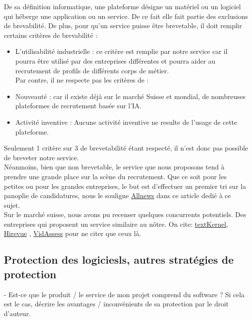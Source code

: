 De sa définition informatique, une plateforme désigne un matériel ou un logiciel qui héberge une application ou un service. De ce fait elle fait partie des exclusions de brevabilité. De plus, pour qu'un service puisse être brevetable, il doit remplir certains critères de brevabilité : 
 \begin{itemize}
     \item L'utilisabilité industrielle : ce critère est remplie par notre service car il pourra être utilisé par des entreprises différentes et pourra aider au recrutement de profils de différents corps de métier. \\
     Par contre, il ne respecte pas les critères de :
     \item Nouveauté : car il existe déjà sur le marché Suisse et mondial, de nombreuses plateformes de recrutement basée sur l'IA.
     \item Activité inventive : Aucune activité inventive ne resulte de l'usage de cette plateforme. 
 \end{itemize}
Seulement 1 critère sur 3 de brevetabilité étant respecté, il n'est donc pas possible de breveter notre service. \\
Néanmoins, bien que non brevetable, le service que nous proposons tend à prendre une grande place sur la scène du recrutement. Que ce soit pour les petites ou pour les grandes entreprises, le but est d'effectuer un premier tri sur la panoplie de candidatures, nous le souligne \href{https://www.allnews.ch/content/points-de-vue/intelligence-artificielle-et-recrutement}{Allnews} dans ce article dedié à ce sujet.  \\ 
 Sur le marché suisse, nous avons pu recenser quelques concurrents potentiels. Des entreprises qui proposent un service similaire au nôtre. On cite: \href{https://www.textkernel.com/fr/?utm_term=recrutement%20intelligence%20artificielle&utm_source=adwords&utm_campaign=FR+-+Search+-+Non+Brand&utm_medium=ppc&hsa_mt=p&hsa_src=g&hsa_kw=recrutement%20intelligence%20artificielle&hsa_ad=629928942899&hsa_tgt=kwd-541674329900&hsa_ver=3&hsa_acc=1393423699&hsa_net=adwords&hsa_cam=18670126951&hsa_grp=144320914202&gclid=CjwKCAiA5Y6eBhAbEiwA_2ZWISLyh3zdDh-KHgpPZ955DcROOiNeKEdHtwnNKpShXb0kbDMqB6jNvRoCTYwQAvD_BwE}{textKernel}, \href{https://www.hirevue.com/}{Hirevue} , \href{https://assessment.aon.com/en-us/video-interviewing-solution}{VidAssess} pour ne citer que ceux là. 

\subsection{Protection des logiciesls, autres stratégies de protection}
- Est-ce que le produit / le service de mon projet comprend du software ? Si cela est le cas, décrire les avantages / inconvénients de sa protection par le droit d’auteur.

